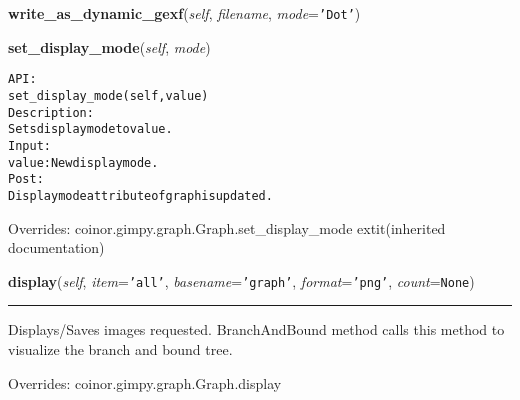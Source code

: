     \vspace{0.5ex}

\hspace{.8\funcindent}\begin{boxedminipage}{\funcwidth}

    \raggedright \textbf{write\_as\_dynamic\_gexf}(\textit{self}, \textit{filename}, \textit{mode}={\tt \texttt{'}\texttt{Dot}\texttt{'}})

\setlength{\parskip}{2ex}
\setlength{\parskip}{1ex}
    \end{boxedminipage}

    \vspace{0.5ex}

\hspace{.8\funcindent}\begin{boxedminipage}{\funcwidth}

    \raggedright \textbf{set\_display\_mode}(\textit{self}, \textit{mode})

\setlength{\parskip}{2ex}
\begin{alltt}

API:
    set\_display\_mode(self, value)
Description:
    Sets display mode to value.
Input:
    value: New display mode.
Post:
    Display mode attribute of graph is updated.
\end{alltt}

\setlength{\parskip}{1ex}
      Overrides: coinor.gimpy.graph.Graph.set\_display\_mode 	extit{(inherited documentation)}

    \end{boxedminipage}

    \vspace{0.5ex}

\hspace{.8\funcindent}\begin{boxedminipage}{\funcwidth}

    \raggedright \textbf{display}(\textit{self}, \textit{item}={\tt \texttt{'}\texttt{all}\texttt{'}}, \textit{basename}={\tt \texttt{'}\texttt{graph}\texttt{'}}, \textit{format}={\tt \texttt{'}\texttt{png}\texttt{'}}, \textit{count}={\tt None})

    \vspace{-1.5ex}

    \rule{\textwidth}{0.5\fboxrule}
\setlength{\parskip}{2ex}
    Displays/Saves images requested. BranchAndBound method calls this 
    method to visualize the branch and bound tree.

\setlength{\parskip}{1ex}
      Overrides: coinor.gimpy.graph.Graph.display

    \end{boxedminipage}

